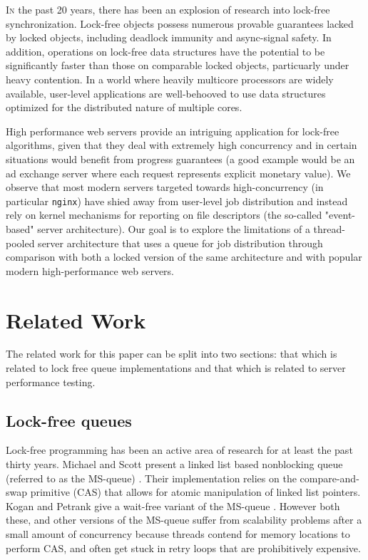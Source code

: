 \documentclass[twoside,10pt]{article}
\begin{document}
\begin{multicols}{2}
  \lettrine[nindent=0em,lines=3]{I}n the past 20 years, there has been
  an explosion of research into lock-free synchronization. Lock-free
  objects possess numerous provable guarantees lacked by locked
  objects, including deadlock immunity and async-signal safety. In
  addition, operations on lock-free data structures have the potential
  to be significantly faster than those on comparable locked objects,
  particuarly under heavy contention. In a world where heavily
  multicore processors are widely available, user-level applications
  are well-behooved to use data structures optimized for the
  distributed nature of multiple cores.
  
High performance web servers provide an intriguing application for
lock-free algorithms, given that they deal with extremely high
concurrency and in certain situations would benefit from progress
guarantees (a good example would be an ad exchange server where each
request represents explicit monetary value). We observe that most
modern servers targeted towards high-concurrency (in particular
\verb+nginx+) have shied away from user-level job distribution and
instead rely on kernel mechanisms for reporting on file descriptors
(the so-called "event-based" server architecture). Our goal is to
explore the limitations of a thread-pooled server architecture that
uses a queue for job distribution through comparison with both a
locked version of the same architecture and with popular modern
high-performance web servers.

\section{Related Work}

The related work for this paper can be split into two sections: that
which is related to lock free queue implementations and that which is
related to server performance testing.

\subsection{Lock-free queues}

Lock-free programming has been an active area of research for at least
the past thirty years. Michael and Scott present a linked list based
nonblocking queue (referred to as the MS-queue) \cite{MS96}. Their
implementation relies on the compare-and-swap primitive (CAS) that
allows for atomic manipulation of linked list pointers. Kogan and
Petrank give a wait-free variant of the MS-queue \cite{KP11}. However
both these, and other versions of the MS-queue suffer from scalability
problems after a small amount of concurrency because threads contend
for memory locations to perform CAS, and often get stuck in retry
loops that are prohibitively expensive.


\end{multicols}
\end{document}
